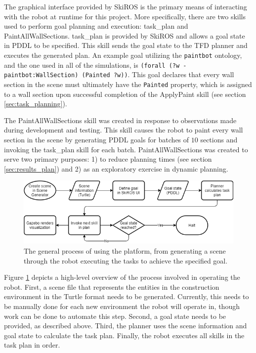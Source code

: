 The graphical interface provided by SkiROS is the primary means of interacting with the robot at runtime for this project. More specifically, there are two skills used to perform goal planning and execution: task\_plan and PaintAllWallSections. task\_plan is provided by SkiROS and allows a goal state in PDDL to be specified. This skill sends the goal state to the TFD planner and executes the generated plan. An example goal utilizing the {\tt paintbot} ontology, and the one used in all of the simulations, is {\tt (forall (?w - paintbot:WallSection) (Painted ?w))}. This goal declares that every wall section in the scene must ultimately have the {\tt Painted} property, which is assigned to a wall section upon successful completion of the ApplyPaint skill (see section \ref{sec:task_planning}).

The PaintAllWallSections skill was created in response to observations made during development and testing. This skill causes the robot to paint every wall section in the scene by generating PDDL goals for batches of $10$ sections and invoking the task\_plan skill for each batch. PaintAllWallSections was created to serve two primary purposes: 1) to reduce planning times (see section \ref{sec:results_plan}) and 2) as an exploratory exercise in dynamic planning.

\begin{figure}
    \centering
    \includegraphics[width=0.75\linewidth]{images/process.png}
    \caption{The general process of using the platform, from generating a scene through the robot executing the tasks to achieve the specified goal.}
    \label{fig:process}
\end{figure}

Figure \ref{fig:process} depicts a high-level overview of the process involved in operating the robot. First, a scene file that represents the entities in the construction environment in the Turtle format needs to be generated. Currently, this needs to be manually done for each new environment the robot will operate in, though work can be done to automate this step. Second, a goal state needs to be provided, as described above. Third, the planner uses the scene information and goal state to calculate the task plan. Finally, the robot executes all skills in the task plan in order.